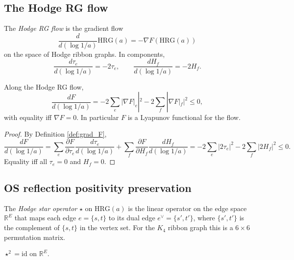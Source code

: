 \subsection{The Hodge RG flow}
\label{ssec:hodge_rg_flow}

\begin{definition}
\label{def:hodge_rg_flow}
The \emph{Hodge RG flow} is the gradient flow
\[
\frac{d}{d(\log 1/a)}\mathrm{HRG}(a)=-\nabla F(\mathrm{HRG}(a))
\]
on the space of Hodge ribbon graphs. In components,
\[
\frac{d\tau_{e}}{d(\log 1/a)}=-2\tau_{e},\qquad
\frac{dH_{f}}{d(\log 1/a)}=-2H_{f}.
\]
\end{definition}

\begin{theorem}
\label{thm:lyapunov}
Along the Hodge RG flow,
\[
\frac{dF}{d(\log 1/a)}=-2\sum_{e}|\nabla F|_{e}|^{2}-2\sum_{f}|\nabla F|_{f}|^{2}\le 0,
\]
with equality iff $\nabla F=0$. In particular $F$ is a Lyapunov
functional for the flow.
\end{theorem}

\begin{proof}
By Definition \ref{def:grad_F},
\[
\frac{dF}{d(\log 1/a)}
=\sum_{e}\frac{\partial F}{\partial\tau_{e}}\frac{d\tau_{e}}{d(\log 1/a)}
+\sum_{f}\frac{\partial F}{\partial H_{f}}\frac{dH_{f}}{d(\log 1/a)}
=-2\sum_{e}|2\tau_{e}|^{2}-2\sum_{f}|2H_{f}|^{2}\le 0.
\]
Equality iff all $\tau_{e}=0$ and $H_{f}=0$.
\end{proof}

\subsection{OS reflection positivity preservation}
\label{ssec:os_preservation}

\begin{definition}
\label{def:hodge_star}
The \emph{Hodge star operator} $\star$ on $\mathrm{HRG}(a)$ is the
linear operator on the edge space $\mathbb{R}^{E}$ that maps each edge
$e=\{s,t\}$ to its dual edge $e^{\vee}=\{s',t'\}$, where
$\{s',t'\}$ is the complement of $\{s,t\}$ in the vertex set. For the
$K_{4}$ ribbon graph this is a $6\times 6$ permutation matrix.
\end{definition}

\begin{lemma}
\label{lem:star_involution}
$\star^{2}=\mathrm{id}$ on $\mathbb{R}^{E}$.
\end{lemma}

